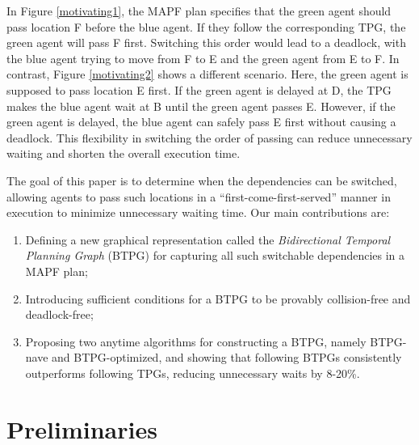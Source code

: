 \documentclass[letterpaper]{article} %
\theoremstyle{definition}
\newcommand{\rishi}[1]{\textcolor{black}{\textbf{Rishi:}}
\textcolor{purple}{#1}}
\newcommand{\andrew}[1]{\textcolor{black}{\textbf{Yifan:}} \textcolor{blue}{#1}}
\begin{document}
In Figure \ref{motivating1}, the MAPF plan specifies that the green agent should pass location F before the blue agent. If they follow the corresponding TPG, the green agent will pass F first. Switching this order would lead to a deadlock, with the blue agent trying to move from F to E and the green agent from E to F.
In contrast, Figure \ref{motivating2} shows a different scenario. Here, the green agent is supposed to pass location E first. If the green agent is delayed at D, the TPG makes the blue agent wait at B until the green agent passes E. However, if the green agent is delayed, the blue agent can safely pass E first without causing a deadlock. This flexibility in switching the order of passing can reduce unnecessary waiting and shorten the overall execution time.


The goal of this paper is to determine when the dependencies can be switched, allowing agents to pass such locations in a ``first-come-first-served'' manner in execution to minimize unnecessary waiting time.  Our main contributions are:
\begin{enumerate}
    \item Defining a new graphical representation called the \emph{Bidirectional Temporal Planning Graph} (BTPG) for capturing all such switchable dependencies in a MAPF plan;
    \item Introducing sufficient conditions for a BTPG to be provably collision-free and deadlock-free;
    \item Proposing two anytime algorithms for constructing a BTPG, namely
    BTPG-nave and BTPG-optimized, and showing that following BTPGs consistently outperforms following TPGs, reducing unnecessary waits by 8-20\%.
\end{enumerate}



\section{Preliminaries}
\end{document}
